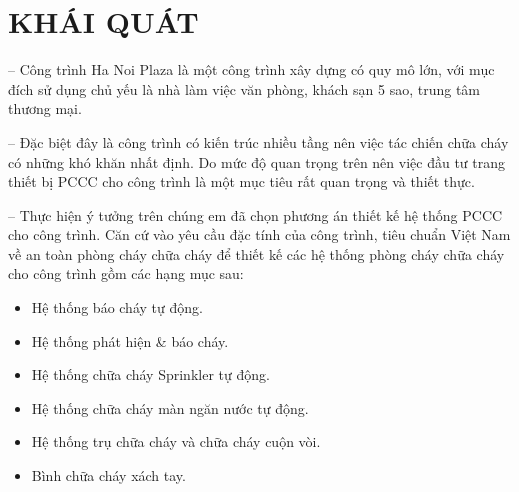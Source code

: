 \section{KHÁI QUÁT}
-- Công trình Ha Noi Plaza là một công trình xây dựng có quy mô lớn, với mục đích sử dụng chủ yếu là nhà làm việc văn phòng, khách sạn 5 sao, trung tâm thương mại. 

-- Đặc biệt đây là công trình có kiến trúc nhiều tầng nên việc tác chiến chữa cháy có những khó khăn nhất định. Do mức độ quan trọng trên nên việc đầu tư trang thiết bị PCCC cho công trình là một mục tiêu rất quan trọng và thiết thực.

-- Thực hiện ý tưởng trên chúng em đã chọn phương án thiết kế hệ thống PCCC cho công trình. Căn cứ vào yêu cầu đặc tính của công trình, tiêu chuẩn Việt Nam về an toàn phòng cháy chữa cháy để thiết kế các hệ thống phòng cháy chữa cháy cho công trình gồm các hạng mục sau:
\begin{itemize}[label={-}]
	\item Hệ thống báo cháy tự động.
	\item Hệ thống phát hiện \& báo cháy.
	\item Hệ thống chữa cháy Sprinkler tự động.
	\item Hệ thống chữa cháy màn ngăn nước tự động.
	\item Hệ thống trụ chữa cháy và chữa cháy cuộn vòi.
	\item Bình chữa cháy xách tay.
\end{itemize}
